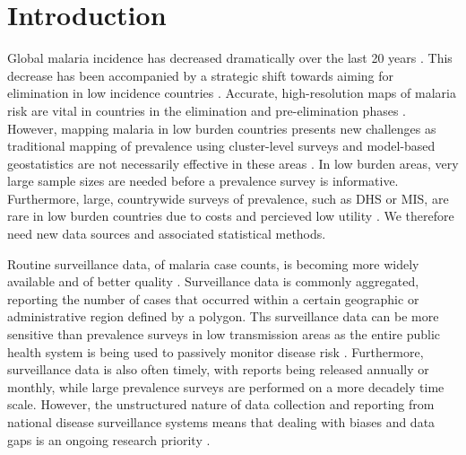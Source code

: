 \documentclass[10pt,letterpaper]{article}
\begin{document}
\linenumbers

\section*{Introduction}

Global malaria incidence has decreased dramatically over the last 20 years \cite{abajobir2017global, bhatt2015effect}.
This decrease has been accompanied by a strategic shift towards aiming for elimination in low incidence countries \cite{world2016world, newby2016path}.
Accurate, high-resolution maps of malaria risk are vital in countries in the elimination and pre-elimination phases \cite{sturrock2016mapping, cohen2017mapping}.
However, mapping malaria in low burden countries presents new challenges as traditional mapping of prevalence \cite{gething2011new, bhatt2017improved, gething2012long} using cluster-level surveys and model-based geostatistics are not necessarily effective in these areas \cite {sturrock2016mapping, sturrock2014fine}.
In low burden areas, very large sample sizes are needed before a prevalence survey is informative.
Furthermore, large, countrywide surveys of prevalence, such as DHS or MIS, are rare in low burden countries due to costs and percieved low utility \cite{dhs}.
We therefore need new data sources and associated statistical methods.



Routine surveillance data, of malaria case counts, is becoming more widely available and of better quality \cite{sturrock2016mapping, ohrt2015information, cibulskis2011worldwide}.
Surveillance data is commonly aggregated, reporting the number of cases that occurred within a certain geographic or administrative region defined by a polygon.
Ths surveillance data can be more sensitive than prevalence surveys in low transmission areas as the entire public health system is being used to passively monitor disease risk \cite{cibulskis2011worldwide}.
Furthermore, surveillance data is also often timely, with reports being released annually or monthly, while large prevalence surveys are performed on a more decadely time scale.
However, the unstructured nature of data collection and reporting from national disease surveillance systems means that dealing with biases and data gaps is an ongoing research priority \cite{battle2016treatment, cibulskis2011worldwide}.
\end{document}
